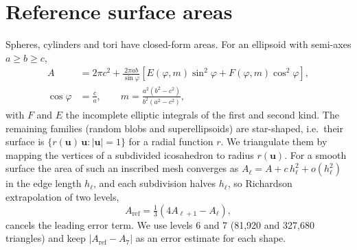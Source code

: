 \section{Reference surface areas}\label{app:reference}
Spheres, cylinders and tori have closed-form areas. For an ellipsoid with semi-axes $a\ge b\ge c$,
\begin{equation}
\begin{aligned}
  A &= 2\pi c^2 + \frac{2\pi ab}{\sin\varphi}\left[E(\varphi,m)\sin^2\varphi + F(\varphi,m)\cos^2\varphi\right],\\
  \cos\varphi &= \frac ca,\qquad m = \frac{a^2(b^2-c^2)}{b^2(a^2-c^2)},
\end{aligned}
\end{equation}
with $F$ and $E$ the incomplete elliptic integrals of the first and second kind. The remaining
families (random blobs and superellipsoids) are star-shaped, i.e.\ their surface is
$\{r(\mathbf u)\,\mathbf u : |\mathbf u|=1\}$ for a radial function $r$. We triangulate them by mapping
the vertices of a subdivided icosahedron to radius $r(\mathbf u)$. For a smooth surface the area of such
an inscribed mesh converges as $A_\ell = A + c\,h_\ell^2 + o(h_\ell^2)$ in the edge length $h_\ell$, and
each subdivision halves $h_\ell$, so Richardson extrapolation of two levels,
\begin{equation}
  A_\text{ref} = \tfrac13\left(4A_{\ell+1} - A_\ell\right),
\end{equation}
cancels the leading error term. We use levels 6 and 7 (81,920 and 327,680 triangles) and keep
$|A_\text{ref}-A_7|$ as an error estimate for each shape.
